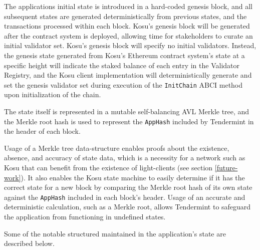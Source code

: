 \documentclass[10pt]{article}
\begin{document}
The applications initial state is introduced in a hard-coded genesis block, and all subsequent states are generated deterministically from previous states, and the transactions processed within each block. Kosu’s genesis block will be generated after the contract system is deployed, allowing time for stakeholders to curate an initial validator set. Kosu’s genesis block will specify no initial validators. Instead, the genesis state generated from Kosu’s Ethereum contract system’s state at a specific height will indicate the staked balance of each entry in the Validator Registry, and the Kosu client implementation will deterministically generate and set the genesis validator set during execution of the \texttt{InitChain} ABCI method upon initialization of the chain\cite{tendermint-abci-apps}.
\medskip

The state itself is represented in a mutable self-balancing AVL Merkle tree\cite{tendermint-iavl}, and the Merkle root hash is used to represent the \texttt{AppHash} included by Tendermint in the header of each block\cite{tendermint-abci-spec}.
\medskip

Usage of a Merkle tree data-structure enables proofs about the existence, absence, and accuracy of state data, which is a necessity for a network such as Kosu that can benefit from the existence of light-clients (see section \ref{future-work}). It also enables the Kosu state machine to easily determine if it has the correct state for a new block by comparing the Merkle root hash of its own state against the \texttt{AppHash} included in each block’s header. Usage of an accurate and deterministic calculation, such as a Merkle root, allows Tendermint to safeguard the application from functioning in undefined states\cite{tendermint-abci-apps}. 
\medskip

Some of the notable structured maintained in the application's state are described below.
\end{document}
